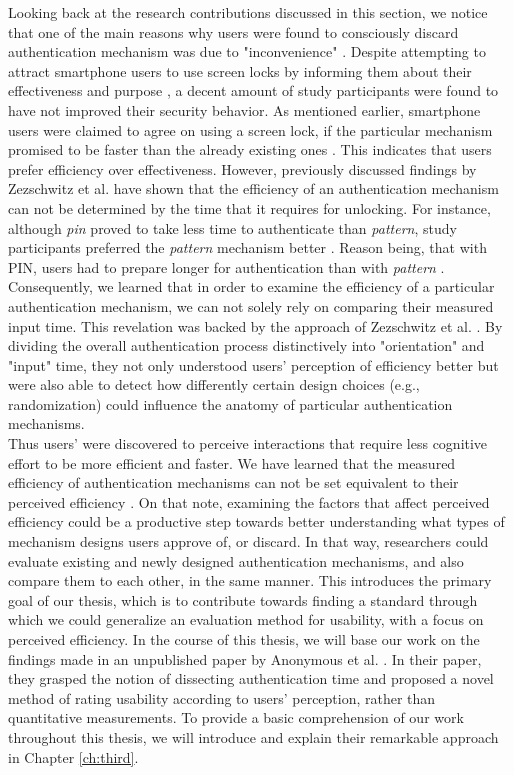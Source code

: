 Looking back at the research contributions discussed in this section, we notice that one of the main reasons why users were found to consciously discard authentication mechanism was due to "inconvenience" \cite{Albayram:2017:BUL:3235924.3235929, Harbach:2016, Alsaleh}. Despite attempting to attract smartphone users to use screen locks by informing them about their effectiveness and purpose \cite{Albayram:2017:BUL:3235924.3235929}, a decent amount of study participants were found to have not improved their security behavior. As mentioned earlier, smartphone users were claimed to agree on using a screen lock, if the particular mechanism promised to be faster than the already existing ones \cite{AnatomySmartphone}. This indicates that users prefer efficiency over effectiveness. However, previously discussed findings by Zezschwitz et al. \cite{PatternWild} have shown that the efficiency of an authentication mechanism can not be determined by the time that it requires for unlocking. For instance, although \textit{pin} proved to take less time to authenticate than \textit{pattern}, study participants preferred the \textit{pattern} mechanism better \cite{PatternWild}. Reason being, that with PIN, users had to prepare longer for authentication than with \textit{pattern} \cite{AnatomySmartphone}. Consequently, we learned that in order to examine the efficiency of a particular authentication mechanism, we can not solely rely on comparing their measured input time. This revelation was backed by the approach of Zezschwitz et al. \cite{Marbles}. By dividing the overall authentication process distinctively into "orientation" and "input" time, they not only understood users' perception of efficiency better but were also able to detect how differently certain design choices (e.g., randomization) could influence the anatomy of particular authentication mechanisms. \\

Thus users' were discovered to perceive interactions that require less cognitive effort to be more efficient and faster. We have learned that the measured efficiency of authentication mechanisms can not be set equivalent to their perceived efficiency \cite{anonymous}. On that note, examining the factors that affect perceived efficiency could be a productive step towards better understanding what types of mechanism designs users approve of, or discard. In that way, researchers could evaluate existing and newly designed authentication mechanisms, and also compare them to each other, in the same manner. This introduces the primary goal of our thesis, which is to contribute towards finding a standard through which we could generalize an evaluation method for usability, with a focus on perceived efficiency. In the course of this thesis, we will base our work on the findings made in an unpublished paper by Anonymous et al. \cite{anonymous}. In their paper, they grasped the notion of dissecting authentication time and proposed a novel method of rating usability according to users' perception, rather than quantitative measurements. To provide a basic comprehension of our work throughout this thesis, we will introduce and explain their remarkable approach in Chapter \ref{ch:third}. 






